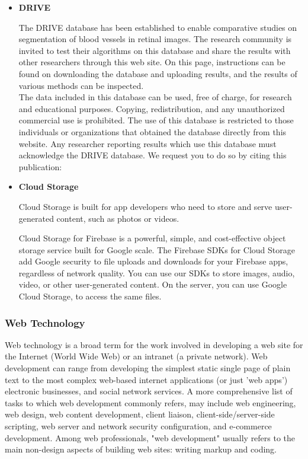 \begin{itemize}
\begin{itemize}

\item \textbf{DRIVE}

The DRIVE database has been established to enable comparative studies on segmentation of blood vessels in retinal images. The research community is invited to test their algorithms on this database and share the results with other researchers through this web site. On this page, instructions can be found on downloading the database and uploading results, and the results of various methods can be inspected. \\

The data included in this database can be used, free of charge, for research and educational purposes. Copying, redistribution, and any unauthorized commercial use is prohibited. The use of this database is restricted to those individuals or organizations that obtained the database directly from this website. Any researcher reporting results which use this database must acknowledge the DRIVE database. We request you to do so by citing this publication:

\item \textbf{Cloud Storage}

Cloud Storage is built for app developers who need to store and serve user-generated content, such as photos or videos.

Cloud Storage for Firebase is a powerful, simple, and cost-effective object storage service built for Google scale. The Firebase SDKs for Cloud Storage add Google security to file uploads and downloads for your Firebase apps, regardless of network quality. You can use our SDKs to store images, audio, video, or other user-generated content. On the server, you can use Google Cloud Storage, to access the same files.
	\end{itemize}
	\end{itemize}
	
\subsubsection{Web Technology}


Web technology is a broad term for the work involved in developing a web site for the Internet (World Wide Web) or an intranet (a private network). Web development can range from developing the simplest static single page of plain text to the most complex web-based internet applications (or just 'web apps') electronic businesses, and social network services. A more comprehensive list of tasks to which web development commonly refers, may include web engineering, web design, web content development, client liaison, client-side/server-side scripting, web server and network security configuration, and e-commerce development. Among web professionals, "web development" usually refers to the main non-design aspects of building web sites: writing markup and coding. 

